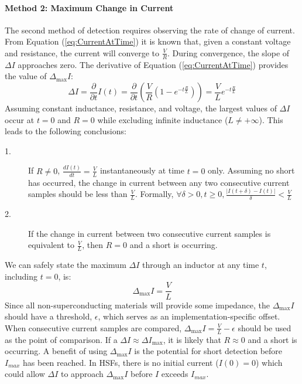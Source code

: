 \paragraph{Method 2: Maximum Change in Current}
The second method of detection requires observing the rate of change of current. From Equation (\ref{eq:CurrentAtTime}) it is known that, given a constant voltage and resistance, the current will converge to $\frac{V}{R}$. During convergence, the slope of $\Delta I$ approaches zero. The derivative of Equation (\ref{eq:CurrentAtTime}) provides the value of $\Delta_{\max}I$:
\begin{equation}
\Delta I = \frac{\partial}{\partial t}I(t) = \frac{\partial}{\partial t}(\frac{V}{R}(1-e^{-t \frac{R}{L}})) = \frac{V}{L}e^{-t \frac{R}{L}}
\end{equation}
Assuming constant inductance, resistance, and voltage, the largest values of $\Delta I$ occur at $t = 0$ and $R = 0$ while excluding infinite inductance ($L \neq +\infty$). This leads to the following conclusions:
\begin{description}
\item [1.] If $R \neq 0$, $\frac{dI(t)}{dt} = \frac{V}{L}$ instantaneously at time $t = 0$ only. Assuming no short has occurred, the change in current between any two consecutive current samples should be less than $\frac{V}{L}$. Formally, $\forall \delta > 0, t \geq 0, \frac{|I(t+\delta) - I(t)|}{\delta} < \frac{V}{L}$ 
\item [2.] If the change in current between two consecutive current samples is equivalent to $\frac{V}{L}$, then $R = 0$ and a short is occurring.
\end{description}

We can safely state the maximum $\Delta I$ through an inductor at any time $t$, including $t = 0$, is:
\begin{equation}\label{eq:DeltaMax}
\Delta_{\max}I = \frac{V}{L} \nonumber
\end{equation}
Since all non-superconducting materials will provide some impedance, the $\Delta_{\max}I$ should have a threshold, $\epsilon$, which serves as an implementation-specific offset. When consecutive current samples are compared, $\Delta_{\max} I = \frac{V}{L} - \epsilon$ should be used as the point of comparison. If a $\Delta I \approx \Delta I_{\max}$, it is likely that $R \approx 0$ and a short is occurring. A benefit of using $\Delta_{\max}I$ is the potential for short detection before $I_{max}$ has been reached. In HSFs, there is no initial current ($I(0) = 0$) which could allow $\Delta I$ to approach $\Delta_{\max}I$ before $I$ exceeds $I_{max}$.
